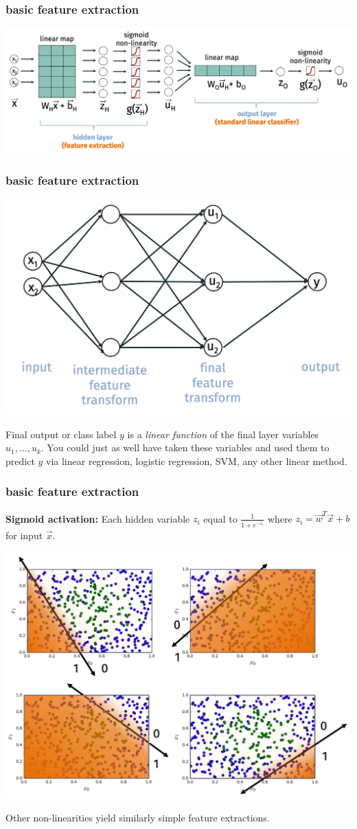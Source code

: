 \documentclass[handout,compress]{beamer}
\begin{document}
	\begin{frame}
		\frametitle{basic feature extraction}		
		\begin{center}
			\includegraphics[width=\textwidth]{neural_net_arch.png}
		\end{center}	
	\end{frame}

	\begin{frame}
	\frametitle{basic feature extraction}		
	\begin{center}
		\includegraphics[width=.7\textwidth]{3layer.png}
	\end{center}	
	Final output or class label $y$ is a \emph{linear function} of the final layer variables $u_1, \ldots, u_k$. You could just as well have taken these variables and used them to predict $y$ via linear regression, logistic regression, SVM, any other linear method.
	\end{frame}

	\begin{frame}
	\frametitle{basic feature extraction}
	\textbf{Sigmoid activation:} Each hidden variable $z_i$ equal to $\frac{1}{1 + e^{-\bar{z}_i}}$ where $z_i = \vec{w}^T\vec{x} + b$ for input $\vec{x}$. 
		\begin{center}
			\includegraphics[width=.6\textwidth]{soft_features.png}
		\end{center}	
	Other non-linearities yield similarly simple feature extractions. 
	\end{frame}
\end{document}
